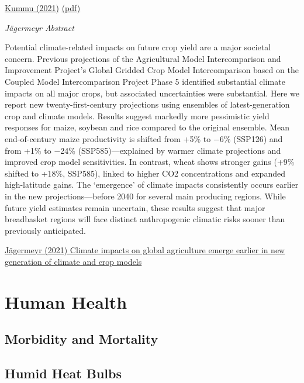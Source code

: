 \documentclass[
]{book}
\begin{document}
\href{https://www.cell.com/one-earth/fulltext/S2590-3322(21)00236-0}{Kummu (2021)}
\href{pdf/Kummu_2021_Food_outside_Safe_Climatic_Space.pdf}{(pdf)}

\emph{Jägermeyr Abstract}

Potential climate-related impacts on future crop yield are a major societal concern. Previous projections of the Agricultural Model Intercomparison and Improvement Project's Global Gridded Crop Model Intercomparison based on the Coupled Model Intercomparison Project Phase 5 identified substantial climate impacts on all major crops, but associated uncertainties were substantial. Here we report new twenty-first-century projections using ensembles of latest-generation crop and climate models. Results suggest markedly more pessimistic yield responses for maize, soybean and rice compared to the original ensemble. Mean end-of-century maize productivity is shifted from +5\% to −6\% (SSP126) and from +1\% to −24\% (SSP585)---explained by warmer climate projections and improved crop model sensitivities. In contrast, wheat shows stronger gains (+9\% shifted to +18\%, SSP585), linked to higher CO2 concentrations and expanded high-latitude gains. The `emergence' of climate impacts consistently occurs earlier in the new projections---before 2040 for several main producing regions. While future yield estimates remain uncertain, these results suggest that major breadbasket regions will face distinct anthropogenic climatic risks sooner than previously anticipated.

\href{https://www.nature.com/articles/s43016-021-00400-y}{Jägermeyr (2021) Climate impacts on global agriculture emerge earlier in new generation of climate and crop models}

\hypertarget{human-health}{%
\chapter{Human Health}\label{human-health}}

\hypertarget{morbidity-and-mortality}{%
\section{Morbidity and Mortality}\label{morbidity-and-mortality}}

\hypertarget{humid-heat-bulbs}{%
\section{Humid Heat Bulbs}\label{humid-heat-bulbs}}
\end{document}
